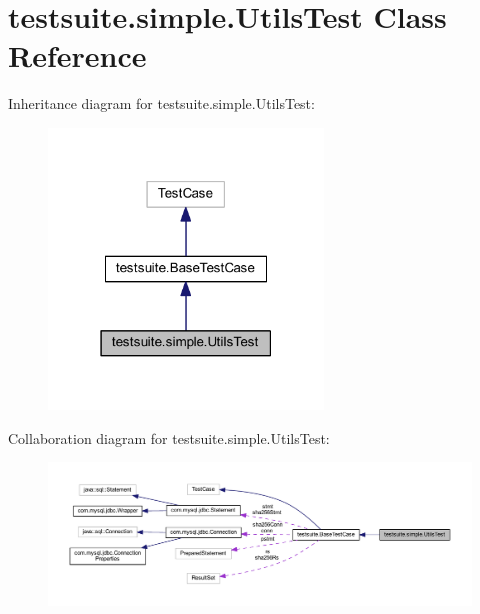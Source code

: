 \hypertarget{classtestsuite_1_1simple_1_1_utils_test}{}\section{testsuite.\+simple.\+Utils\+Test Class Reference}
\label{classtestsuite_1_1simple_1_1_utils_test}


Inheritance diagram for testsuite.\+simple.\+Utils\+Test\+:
\nopagebreak
\begin{figure}[H]
\begin{center}
\leavevmode
\includegraphics[width=207pt]{classtestsuite_1_1simple_1_1_utils_test__inherit__graph}
\end{center}
\end{figure}


Collaboration diagram for testsuite.\+simple.\+Utils\+Test\+:
\nopagebreak
\begin{figure}[H]
\begin{center}
\leavevmode
\includegraphics[width=350pt]{classtestsuite_1_1simple_1_1_utils_test__coll__graph}
\end{center}
\end{figure}

